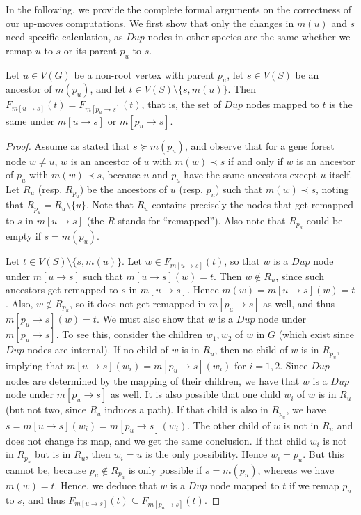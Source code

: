 \documentclass[10pt]{article}
\begin{document}
\begin{toappendix}
In the following, we provide the complete formal arguments on the correctness of our up-moves computations.  
We first show that only the changes in $m(u)$ and $s$ need specific calculation, as $Dup$ nodes in other species are the same whether we remap $u$ to $s$ or its parent $p_u$ to $s$.

\begin{lemmarep}\label{lem:parent-remap-t}
    Let $u \in V(G)$ be a non-root vertex with parent $p_u$, let $s \in V(S)$ be an ancestor of $m(p_u)$, and let $t \in V(S) \setminus \{s, m(u)\}$.  
    Then $F_{m[u \rightarrow s]}(t) = F_{m[p_u \rightarrow s]}(t)$, that is, the set of $Dup$ nodes mapped to $t$ is the same under $m[u \rightarrow s]$ or $m[p_u \rightarrow s]$.
\end{lemmarep}

\begin{proof}
    Assume as stated that $s \succeq m(p_u)$, and observe that for a gene forest node $w \neq u$, $w$ is an ancestor of $u$ with $m(w) \prec s$ if and only if $w$ is an ancestor of $p_u$ with $m(w) \prec s$, because $u$ and $p_u$ have the same ancestors except $u$ itself.  Let $R_u$ (resp. $R_{p_u}$) be the ancestors of $u$ (resp. $p_u$) such that $m(w) \prec s$, noting that $R_{p_u} = R_u \setminus \{u\}$.
    Note that $R_u$ contains precisely the nodes that get remapped to $s$ in $m[u \rightarrow s]$ (the $R$ stands for ``remapped'').  Also note that $R_{p_u}$ could be empty if $s = m(p_u)$.
    
    Let $t \in V(S) \setminus \{s, m(u)\}$. 
    Let $w \in F_{m[u \rightarrow s]}(t)$, so that $w$ is a $Dup$ node under $m[u \rightarrow s]$ such that $m[u \rightarrow s](w) = t$.  Then $w \notin R_u$, since such ancestors get remapped to $s$ in $m[u \rightarrow s]$.  Hence $m(w) = m[u \rightarrow s](w) = t$. Also, $w \notin R_{p_u}$, so it does not get remapped in $m[p_u \rightarrow s]$ as well, and thus $m[p_u \rightarrow s](w) = t$.  
    We must also show that $w$ is a $Dup$ node under $m[p_u \rightarrow s]$.  To see this, consider the children $w_1, w_2$ of $w$ in $G$ (which exist since $Dup$ nodes are internal).  If no child of $w$ is in $R_u$, then no child of $w$ is in $R_{p_u}$, implying that $m[u \rightarrow s](w_i) = m[p_u \rightarrow s](w_i)$ for $i = 1,2$.  Since $Dup$ nodes are determined by the mapping of their children, we have that $w$ is a $Dup$ node under $m[p_u \rightarrow s]$ as well.
    It is also possible that one child $w_i$ of $w$ is in $R_u$ (but not two, since $R_u$ induces a path).  If that child is also in $R_{p_u}$, we have $s = m[u \rightarrow s](w_i) = m[p_u \rightarrow s](w_i)$.  The other child of $w$ is not in $R_u$ and does not change its map, and we get the same conclusion.  If that child $w_i$ is not in $R_{p_u}$ but is in $R_u$, then $w_i = u$ is the only possibility.  Hence $w_i = p_u$.  But this cannot be, because $p_u \notin R_{p_u}$ is only possible if $s = m(p_u)$, whereas we have $m(w) = t$.  Hence, we deduce that $w$ is a $Dup$ node mapped to $t$ if we remap $p_u$ to $s$, and thus $F_{m[u \rightarrow s]}(t) \subseteq F_{m[p_u \rightarrow s]}(t)$.
    

\end{proof}
\end{toappendix}
\end{document}
